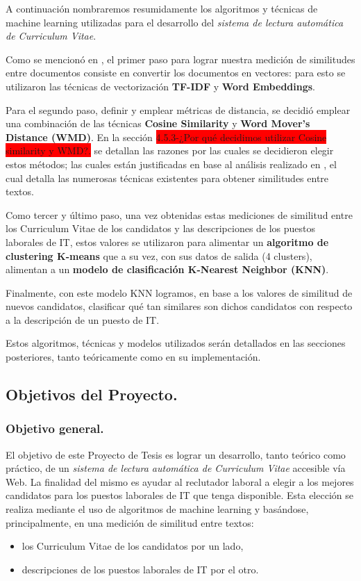 \documentclass[12pt,a4paper]{article}
\begin{document}
\begin{sloppypar}
A continuación nombraremos resumidamente los algoritmos y técnicas de machine learning utilizadas para el desarrollo del \textit{sistema de lectura automática de Curriculum Vitae}. 

Como se mencionó en \textit{}, el primer paso para lograr nuestra medición de similitudes entre documentos consiste en convertir los documentos en vectores: para esto se utilizaron las técnicas de vectorización \textbf{TF-IDF} y \textbf{Word Embeddings}.

Para el segundo paso, definir y emplear métricas de distancia, se decidió emplear una combinación de las técnicas \textbf{Cosine Similarity} y \textbf{Word Mover’s Distance (WMD)}. En la sección \colorbox{red}{4.5.3-¿Por qué decidimos utilizar Cosine similarity y WMD?.} se detallan las razones por las cuales se decidieron elegir estos métodos; las cuales están justificadas en base al análisis realizado en \textit{}, el cual detalla las numerosas técnicas existentes para obtener similitudes entre textos.

Como tercer y último paso, una vez obtenidas estas mediciones de similitud entre los Curriculum Vitae de los candidatos y las descripciones de los puestos laborales de IT, estos valores se utilizaron para alimentar un \textbf{algoritmo de clustering K-means} que a su vez, con sus datos de salida (4 clusters), alimentan a un \textbf{modelo de clasificación K-Nearest Neighbor (KNN)}.

Finalmente, con este modelo KNN logramos, en base a los valores de similitud de nuevos candidatos, clasificar qué tan similares son dichos candidatos con respecto a la descripción de un puesto de IT.

Estos algoritmos, técnicas y modelos utilizados serán detallados en las secciones posteriores, tanto teóricamente como en su implementación. 

\cleardoublepage    %

\subsection{Objetivos del Proyecto.}

\subsubsection{Objetivo general.}

El objetivo de este Proyecto de Tesis es lograr un desarrollo, tanto teórico como práctico, de un \textit{sistema de lectura automática de Curriculum Vitae} accesible vía Web. La finalidad del mismo es ayudar al reclutador laboral a elegir a los mejores candidatos para los puestos laborales de IT que tenga disponible. Esta elección se realiza mediante el uso de algoritmos de machine learning y basándose, principalmente, en una medición de similitud entre textos:  
\begin{itemize}
\item los Curriculum Vitae de los candidatos por un lado, 
\item descripciones de los puestos laborales de IT por el otro.
\end{itemize} 


\end{sloppypar}
\end{document}
